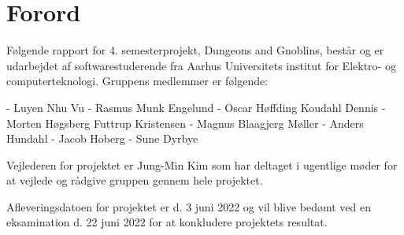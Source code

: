 \section{Forord}
Følgende rapport for 4.  semesterprojekt, Dungeons and Gnoblins, består og er udarbejdet af softwarestuderende fra Aarhus Universitets institut for Elektro- og computerteknologi. Gruppens medlemmer er følgende:

- Luyen Nhu Vu
- Rasmus Munk Engelund
- Oscar Høffding Koudahl Dennis
- Morten Høgsberg Futtrup Kristensen
- Magnus Blaagjerg Møller
- Anders Hundahl
- Jacob Hoberg
- Sune Dyrbye

Vejlederen for projektet er Jung-Min Kim som har deltaget i ugentlige møder for at vejlede og rådgive gruppen gennem hele projektet.

Afleveringsdatoen for projektet er d. 3 juni 2022 og vil blive bedømt ved en eksamination d. 22 juni 2022 for at konkludere projektets resultat.